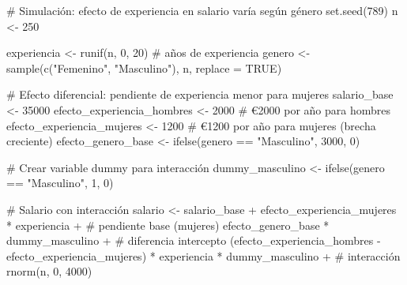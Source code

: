 \documentclass[
  letterpaper,
  DIV=11,
  numbers=noendperiod]{scrreprt}
\newenvironment{Shaded}{\begin{snugshade}}{\end{snugshade}}
\newcommand{\AttributeTok}[1]{\textcolor[rgb]{0.40,0.45,0.13}{#1}}
\newcommand{\CommentTok}[1]{\textcolor[rgb]{0.37,0.37,0.37}{#1}}
\newcommand{\ConstantTok}[1]{\textcolor[rgb]{0.56,0.35,0.01}{#1}}
\newcommand{\DecValTok}[1]{\textcolor[rgb]{0.68,0.00,0.00}{#1}}
\newcommand{\FunctionTok}[1]{\textcolor[rgb]{0.28,0.35,0.67}{#1}}
\newcommand{\NormalTok}[1]{\textcolor[rgb]{0.00,0.23,0.31}{#1}}
\newcommand{\OtherTok}[1]{\textcolor[rgb]{0.00,0.23,0.31}{#1}}
\newcommand{\SpecialCharTok}[1]{\textcolor[rgb]{0.37,0.37,0.37}{#1}}
\newcommand{\StringTok}[1]{\textcolor[rgb]{0.13,0.47,0.30}{#1}}
\begin{document}
\begin{tcolorbox}[enhanced jigsaw, breakable, toprule=.15mm, bottomtitle=1mm, coltitle=black, colbacktitle=quarto-callout-tip-color!10!white, titlerule=0mm, opacitybacktitle=0.6, bottomrule=.15mm, toptitle=1mm, title=\textcolor{quarto-callout-tip-color}{\faLightbulb}\hspace{0.5em}{Ejemplo: Interacción experiencia-género en salarios}, arc=.35mm, rightrule=.15mm, opacityback=0, colframe=quarto-callout-tip-color-frame, leftrule=.75mm, left=2mm, colback=white]

\begin{Shaded}
\begin{Highlighting}[]
\CommentTok{\# Simulación: efecto de experiencia en salario varía según género}
\FunctionTok{set.seed}\NormalTok{(}\DecValTok{789}\NormalTok{)}
\NormalTok{n }\OtherTok{\textless{}{-}} \DecValTok{250}

\NormalTok{experiencia }\OtherTok{\textless{}{-}} \FunctionTok{runif}\NormalTok{(n, }\DecValTok{0}\NormalTok{, }\DecValTok{20}\NormalTok{)  }\CommentTok{\# años de experiencia}
\NormalTok{genero }\OtherTok{\textless{}{-}} \FunctionTok{sample}\NormalTok{(}\FunctionTok{c}\NormalTok{(}\StringTok{"Femenino"}\NormalTok{, }\StringTok{"Masculino"}\NormalTok{), n, }\AttributeTok{replace =} \ConstantTok{TRUE}\NormalTok{)}

\CommentTok{\# Efecto diferencial: pendiente de experiencia menor para mujeres}
\NormalTok{salario\_base }\OtherTok{\textless{}{-}} \DecValTok{35000}
\NormalTok{efecto\_experiencia\_hombres }\OtherTok{\textless{}{-}} \DecValTok{2000}  \CommentTok{\# €2000 por año para hombres}
\NormalTok{efecto\_experiencia\_mujeres }\OtherTok{\textless{}{-}} \DecValTok{1200}  \CommentTok{\# €1200 por año para mujeres (brecha creciente)}
\NormalTok{efecto\_genero\_base }\OtherTok{\textless{}{-}} \FunctionTok{ifelse}\NormalTok{(genero }\SpecialCharTok{==} \StringTok{"Masculino"}\NormalTok{, }\DecValTok{3000}\NormalTok{, }\DecValTok{0}\NormalTok{)}

\CommentTok{\# Crear variable dummy para interacción}
\NormalTok{dummy\_masculino }\OtherTok{\textless{}{-}} \FunctionTok{ifelse}\NormalTok{(genero }\SpecialCharTok{==} \StringTok{"Masculino"}\NormalTok{, }\DecValTok{1}\NormalTok{, }\DecValTok{0}\NormalTok{)}

\CommentTok{\# Salario con interacción}
\NormalTok{salario }\OtherTok{\textless{}{-}}\NormalTok{ salario\_base }\SpecialCharTok{+} 
\NormalTok{           efecto\_experiencia\_mujeres }\SpecialCharTok{*}\NormalTok{ experiencia }\SpecialCharTok{+}  \CommentTok{\# pendiente base (mujeres)}
\NormalTok{           efecto\_genero\_base }\SpecialCharTok{*}\NormalTok{ dummy\_masculino }\SpecialCharTok{+}      \CommentTok{\# diferencia intercepto}
\NormalTok{           (efecto\_experiencia\_hombres }\SpecialCharTok{{-}}\NormalTok{ efecto\_experiencia\_mujeres) }\SpecialCharTok{*}\NormalTok{ experiencia }\SpecialCharTok{*}\NormalTok{ dummy\_masculino }\SpecialCharTok{+}  \CommentTok{\# interacción}
           \FunctionTok{rnorm}\NormalTok{(n, }\DecValTok{0}\NormalTok{, }\DecValTok{4000}\NormalTok{)}


\end{Highlighting}
\end{Shaded}
\end{tcolorbox}
\end{document}
